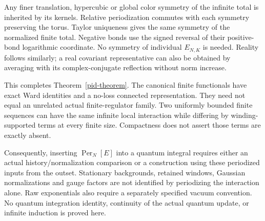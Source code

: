 Any finer translation, hypercubic or global color symmetry of
the infinite total is inherited by its kernels. Relative
periodization commutes with each symmetry preserving the torus.
Taylor uniqueness gives the same symmetry of the normalized
finite total. Negative bonds use the signed reversal of their
positive-bond logarithmic coordinate. No symmetry of individual
$E_{N,K}$ is needed. Reality follows similarly; a real covariant
representative can also be obtained by averaging with its
complex-conjugate reflection without norm increase.

This completes Theorem~\ref{pid-theorem}. The canonical finite
functionals have exact Ward identities and a no-loss connected
representation. They need not equal an unrelated actual
finite-regulator family. Two uniformly bounded finite sequences
can have the same infinite local interaction while differing
by winding-supported terms at every finite size. Compactness
does not assert those terms are exactly absent.

Consequently, inserting $\operatorname{Per}_N[E]$ into a quantum
integral requires either an actual history/normalization comparison
or a construction using these periodized inputs from the outset.
Stationary backgrounds, retained windows, Gaussian normalizations
and gauge factors are not identified by periodizing the interaction
alone. Raw exponentials also require a separately specified vacuum
convention. No quantum integration identity, continuity of the
actual quantum update, or infinite induction is proved here.
